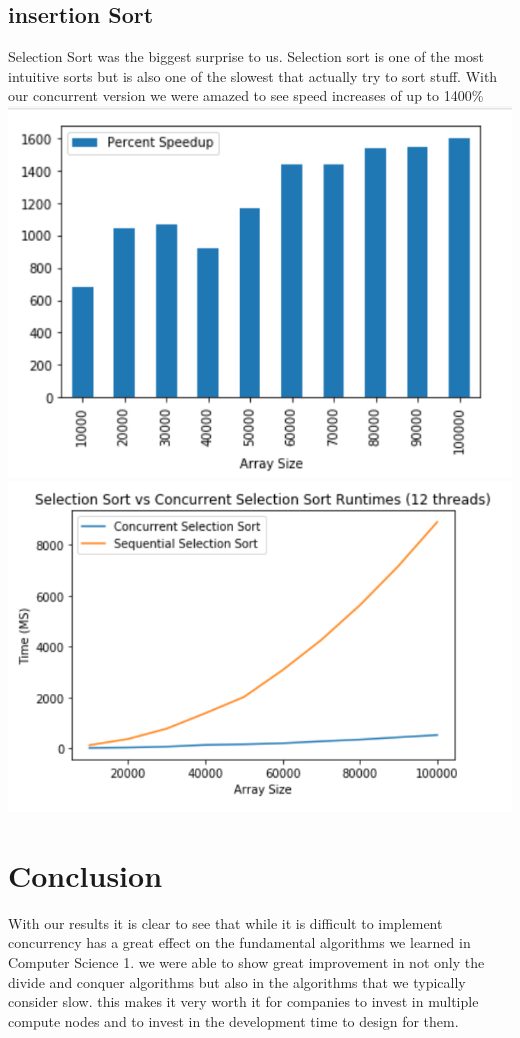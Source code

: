 \documentclass{article}
\begin{document}
\subsection{insertion Sort}
Selection Sort was the biggest surprise to us. Selection sort is one of the most intuitive sorts but is also one of the slowest that actually try to sort stuff. With our concurrent version we were amazed to see speed increases of up to 1400\%\newline
\includegraphics{figures/selectionbar.PNG}\newline
\includegraphics{figures/selectionline.PNG}

\section{Conclusion}
With our results it is clear to see that while it is difficult to implement concurrency has a great effect on the fundamental algorithms we learned in Computer Science 1. we were able to show great improvement in not only the divide and conquer algorithms but also in the algorithms that we typically consider slow. this makes it very worth it for companies to invest in multiple compute nodes and to invest in the development time to design for them.
\end{document}
